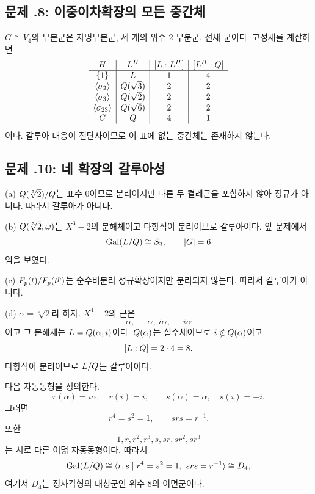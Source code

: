 \subsection*{문제 \thechapter.8: 이중이차확장의 모든 중간체}

\begin{solution}
$G\cong V_4$의 부분군은 자명부분군, 세 개의 위수 $2$ 부분군, 전체 군이다. 고정체를 계산하면
\[
\begin{array}{c|c|c|c}
H & L^H & [L:L^H] & [L^H:Q]\\
\hline
\{1\}&L&1&4\\
\langle\sigma_2\rangle&Q(\sqrt3)&2&2\\
\langle\sigma_3\rangle&Q(\sqrt2)&2&2\\
\langle\sigma_{23}\rangle&Q(\sqrt6)&2&2\\
G&Q&4&1
\end{array}
\]
이다. 갈루아 대응이 전단사이므로 이 표에 없는 중간체는 존재하지 않는다.
\end{solution}

\subsection*{문제 \thechapter.10: 네 확장의 갈루아성}

\begin{solution}
(a) $Q(\sqrt[3]{2})/Q$는 표수 $0$이므로 분리이지만 다른 두 켤레근을 포함하지 않아 정규가 아니다. 따라서 갈루아가 아니다.

(b) $Q(\sqrt[3]{2},\omega)$는 $X^3-2$의 분해체이고 다항식이 분리이므로 갈루아이다. 앞 문제에서
\[
  \operatorname{Gal}(L/Q)\cong S_3,
  \qquad |G|=6
\]
임을 보였다.

(c) $F_p(t)/F_p(t^p)$는 순수비분리 정규확장이지만 분리되지 않는다. 따라서 갈루아가 아니다.

(d) $\alpha=\sqrt[4]{2}$라 하자. $X^4-2$의 근은
\[
  \alpha,\ -\alpha,\ i\alpha,\ -i\alpha
\]
이고 그 분해체는 $L=Q(\alpha,i)$이다. $Q(\alpha)$는 실수체이므로 $i\notin Q(\alpha)$이고
\[
  [L:Q]=2\cdot4=8.
\]
다항식이 분리이므로 $L/Q$는 갈루아이다.

다음 자동동형을 정의한다.
\[
  r(\alpha)=i\alpha,
  \quad r(i)=i,
  \qquad
  s(\alpha)=\alpha,
  \quad s(i)=-i.
\]
그러면
\[
  r^4=s^2=1,
  \qquad
  srs=r^{-1}.
\]
또한
\[
  1,r,r^2,r^3,s,sr,sr^2,sr^3
\]
는 서로 다른 여덟 자동동형이다. 따라서
\[
  \operatorname{Gal}(L/Q)
  \cong
  \langle r,s\mid r^4=s^2=1,\ srs=r^{-1}\rangle
  \cong D_4,
\]
여기서 $D_4$는 정사각형의 대칭군인 위수 $8$의 이면군이다.
\end{solution}
